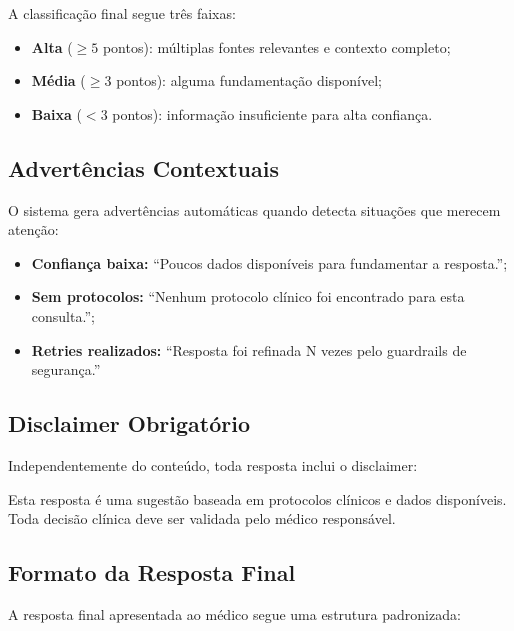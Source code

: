 A classificação final segue três faixas:

\begin{itemize}
    \item \textbf{Alta} ($\geq 5$ pontos): múltiplas fontes relevantes e contexto completo;
    \item \textbf{Média} ($\geq 3$ pontos): alguma fundamentação disponível;
    \item \textbf{Baixa} ($< 3$ pontos): informação insuficiente para alta confiança.
\end{itemize}

\subsection{Advertências Contextuais}

O sistema gera advertências automáticas quando detecta situações que merecem atenção:

\begin{itemize}
    \item \textbf{Confiança baixa:} ``Poucos dados disponíveis para fundamentar a resposta.'';
    \item \textbf{Sem protocolos:} ``Nenhum protocolo clínico foi encontrado para esta consulta.'';
    \item \textbf{Retries realizados:} ``Resposta foi refinada N vezes pelo guardrails de segurança.''
\end{itemize}

\subsection{Disclaimer Obrigatório}

Independentemente do conteúdo, toda resposta inclui o disclaimer:

\begin{warningbox}
Esta resposta é uma sugestão baseada em protocolos clínicos e dados disponíveis. Toda decisão clínica deve ser validada pelo médico responsável.
\end{warningbox}

\subsection{Formato da Resposta Final}

A resposta final apresentada ao médico segue uma estrutura padronizada:


